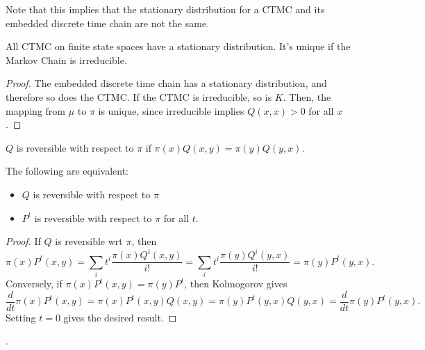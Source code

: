 Note that this implies that the stationary distribution for a CTMC and its embedded discrete time chain are not the same.

\begin{theorem}
\corlabel

All CTMC on finite state spaces have a stationary distribution. It's unique if the Markov Chain is irreducible. 
\end{theorem}

\begin{proof}
The embedded discrete time chain has a stationary distribution, and therefore so does the CTMC. If the CTMC is irreducible, so is $K$. Then, the mapping from $\mu$ to $\pi$ is unique, since irreducible implies $Q(x,x) > 0$ for all $x$.  
\end{proof}

\begin{definition}

$Q$ is reversible with respect to $\pi$ if $\pi(x)Q(x,y) = \pi(y)Q(y,x)$. 
\end{definition}

\begin{theorem}
\lemlabel

The following are equivalent: 

\begin{itemize}
	\item $Q$ is reversible with respect to $\pi$
	\item $P^t$ is reversible with respect to $\pi$ for all $t$. 
\end{itemize}
\end{theorem}

\begin{proof}
If $Q$ is reversible wrt $\pi$, then 
\[\pi(x) P^t(x,y) = \sum_i t^i \frac{\pi(x)Q^i(x,y)}{i!} = \sum_i t^i \frac{\pi(y) Q^i(y,x)}{i!} = \pi(y) P^t(y,x).\] 
Conversely, if $\pi(x) P^t(x,y) = \pi(y)P^t$, then Kolmogorov gives
\[\frac{d}{dt}\pi(x) P^t(x,y) = \pi(x) P^t(x,y) Q(x,y) = \pi(y) P^t(y,x) Q(y,x) = \frac{d}{dt}\pi(y) P^t(y,x).\]
Setting $t=0$ gives the desired result.
\end{proof}

. 
